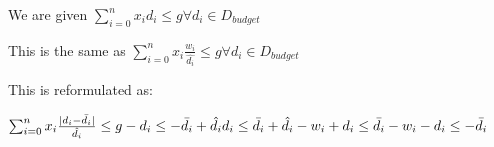 \documentclass[11pt]{article}
\begin{document}
We are given \(\sum_{i=0}^n x_id_i \le g \forall d_i \in D_{budget}\)

This is the same as
\(\sum_{i=0}^n x_i\frac{w_i}{\hat{d_i}} \le g \forall d_i \in D_{budget}\)

This is reformulated as:

\(\sum_{i=0}^n x_i\frac{|d_i - \bar{d_i}|}{\hat{d_i}} \le g \\ -d_i \le -\bar{d_i} + \hat{d_i} \\ d_i \le \bar{d_i} + \hat{d_i} \\ -w_i + d_i \le \bar{d_i} \\ -w_i - d_i \le -\bar{d_i}\)


    
    
    
    
\end{document}
